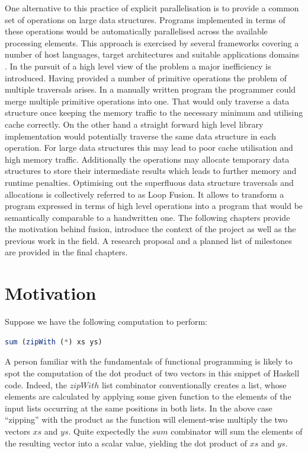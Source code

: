 \documentclass[preamble.tex]{subfiles}
\begin{document}
One alternative to this practice of explicit parallelisation is to provide a common set of operations on large data structures. Programs implemented in terms of these operations would be automatically parallelised across the available processing elements. This approach is exercised by several frameworks covering a number of host languages, target architectures and suitable applications domains \cite{PLKC08,KCL+10,CKL+11,AS07}. In the pursuit of a high level view of the problem a major inefficiency is introduced. Having provided a number of primitive operations the problem of multiple traversals arises. In a manually written program the programmer could merge multiple primitive operations into one. That would only traverse a data structure once keeping the memory traffic to the necessary minimum and utilising cache correctly. On the other hand a straight forward high level library implementation would potentially traverse the same data structure in each operation. For large data structures this may lead to poor cache utilisation and high memory traffic. Additionally the operations may allocate temporary data structures to store their intermediate results which leads to further memory and runtime penalties. Optimising out the superfluous data structure traversals and allocations is collectively referred to as Loop Fusion. It allows to transform a program expressed in terms of high level operations into a program that would be semantically comparable to a handwritten one. The following chapters provide the motivation behind fusion, introduce the context of the project as well as the previous work in the field. A research proposal and a planned list of milestones are provided in the final chapters.


\pagebreak
\section{Motivation}

Suppose we have the following computation to perform:

\begin{lstlisting}[basicstyle={\ttfamily},language=Haskell,tabsize=4]
sum (zipWith (*) xs ys)
\end{lstlisting}


A person familiar with the fundamentals of functional programming is likely to spot the computation of the dot product of two vectors in this snippet of Haskell code. Indeed, the $zipWith$ list combinator conventionally creates a list, whose elements are calculated by applying some given function to the elements of the input lists occurring at the same positions in both lists. In the above case {}``zipping'' with the product as the function will element-wise multiply the two vectors $xs$ and $ys$. Quite expectedly the $sum$ combinator will sum the elements of the resulting vector into a scalar value, yielding the dot product of $xs$ and $ys$.
\end{document}
